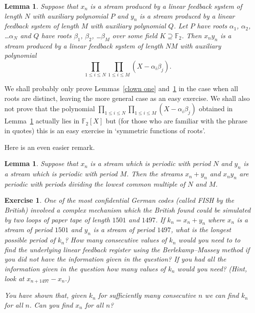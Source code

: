 \documentclass[12pt,a4paper]{article}
\theoremstyle{plain}
\newtheorem{lemma}[theorem]{Lemma}
\newtheorem{exercise}[theorem]{Exercise}
\theoremstyle{definition}
\begin{document}
\begin{lemma}\label{clown two}
Suppose that $x_{n}$ is a stream
produced by a linear feedback system of length $N$
with auxiliary
polynomial $P$ and $y_{n}$  is a stream
produced by a linear feedback system of length $M$
with auxiliary polynomial $Q$.
Let  $P$ have roots $\alpha_{1}$, $\alpha_{2}$,
\dots $\alpha_{N}$ and $Q$ have roots
$\beta_{1}$, $\beta_{2}$,
\dots $\beta_{M}$ over some field $K\supseteq {\mathbb F}_{2}$.
Then $x_{n}y_{n}$ is a stream produced by
a linear feedback system of length $NM$
with auxiliary polynomial
\[\prod_{1\leq i\leq N}\prod_{1\leq i\leq M}(X-\alpha_{i}\beta_{j}).\]
\end{lemma}
\noindent
We shall probably only prove Lemmas~\ref{clown one}
and~\ref{clown two} in the case when all roots are
distinct, leaving the more general case as an
easy exercise. We shall also not prove that
the polynomial
$\prod_{1\leq i\leq N}\prod_{1\leq i\leq M}(X-\alpha_{i}\beta_{j})$
obtained in Lemma~\ref{clown two}
actually lies in ${\mathbb F}_{2}[X]$ but (for those who
are familiar with the phrase in quotes)
this is an easy exercise
in `symmetric functions of roots'.

Here is an even easier remark.
\begin{lemma}\label{clown three}
Suppose that $x_{n}$ is a stream
which is periodic with period $N$
and $y_{n}$ is a stream which is periodic
with period $M$. Then the streams
$x_{n}+y_{n}$ and $x_{n}y_{n}$
are periodic with periods dividing
the lowest common multiple of $N$ and $M$.
\end{lemma}
\begin{exercise}\label{Fish}
One of the most confidential
German codes (called FISH by the British)
involved a complex mechanism which
the British found could be simulated
by two loops of paper tape of
length $1501$ and $1497$. If $k_{n}=x_{n}+y_{n}$
where $x_{n}$ is a stream of period $1501$
and $y_{n}$ is a stream of period $1497$,
what is the longest possible period of $k_{n}$?
How many consecutive values of $k_{n}$ would you
need to to find the underlying linear feedback register
using the Berlekamp--Massey method if you did
not have the information given in the question? 
If you had
all the information given in the question
how many values of $k_{n}$ would you need?
(Hint, look at $x_{n+1497}-x_{n}$.)

You have shown that, given $k_{n}$ for sufficiently
many consecutive $n$ we can find $k_{n}$ for all $n$.
Can you find $x_{n}$ for all $n$? 
\end{exercise}
\end{document}
